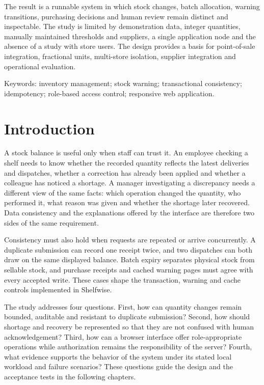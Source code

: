 \documentclass[12pt,a4paper,oneside]{report}
\begin{document}
The result is a runnable system in which stock changes, batch allocation, warning transitions, purchasing decisions and human review remain distinct and inspectable. The study is limited by demonstration data, integer quantities, manually maintained thresholds and suppliers, a single application node and the absence of a study with store users. The design provides a basis for point-of-sale integration, fractional units, multi-store isolation, supplier integration and operational evaluation.


Keywords: inventory management; stock warning; transactional consistency; idempotency; role-based access control; responsive web application.


\chapter*{Introduction}


A stock balance is useful only when staff can trust it. An employee checking a shelf needs to know whether the recorded quantity reflects the latest deliveries and dispatches, whether a correction has already been applied and whether a colleague has noticed a shortage. A manager investigating a discrepancy needs a different view of the same facts: which operation changed the quantity, who performed it, what reason was given and whether the shortage later recovered. Data consistency and the explanations offered by the interface are therefore two sides of the same requirement.


Consistency must also hold when requests are repeated or arrive concurrently. A duplicate submission can record one receipt twice, and two dispatches can both draw on the same displayed balance. Batch expiry separates physical stock from sellable stock, and purchase receipts and cached warning pages must agree with every accepted write. These cases shape the transaction, warning and cache controls implemented in Shelfwise.


The study addresses four questions. First, how can quantity changes remain bounded, auditable and resistant to duplicate submission? Second, how should shortage and recovery be represented so that they are not confused with human acknowledgement? Third, how can a browser interface offer role-appropriate operations while authorization remains the responsibility of the server? Fourth, what evidence supports the behavior of the system under its stated local workload and failure scenarios? These questions guide the design and the acceptance tests in the following chapters.
\end{document}
